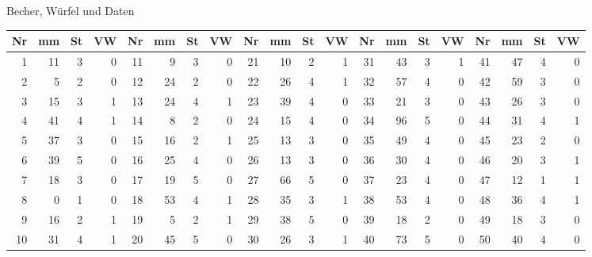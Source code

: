 \begin{uebungsblatt}{Becher, Würfel und Daten}
\begin{center}
\footnotesize
\setlength{\tabcolsep}{3.2pt}
\begin{tabular}{@{}rrrr@{\hspace{9pt}}rrrr@{\hspace{9pt}}rrrr@{\hspace{9pt}}rrrr@{\hspace{9pt}}rrrr@{}}
\toprule
\textbf{Nr} & \textbf{mm} & \textbf{St} & \textbf{VW} &
\textbf{Nr} & \textbf{mm} & \textbf{St} & \textbf{VW} &
\textbf{Nr} & \textbf{mm} & \textbf{St} & \textbf{VW} &
\textbf{Nr} & \textbf{mm} & \textbf{St} & \textbf{VW} &
\textbf{Nr} & \textbf{mm} & \textbf{St} & \textbf{VW} \\
\midrule
 1 & 11 & 3 & 0 & 11 &  9 & 3 & 0 & 21 & 10 & 2 & 1 & 31 & 43 & 3 & 1 & 41 & 47 & 4 & 0 \\
 2 &  5 & 2 & 0 & 12 & 24 & 2 & 0 & 22 & 26 & 4 & 1 & 32 & 57 & 4 & 0 & 42 & 59 & 3 & 0 \\
 3 & 15 & 3 & 1 & 13 & 24 & 4 & 1 & 23 & 39 & 4 & 0 & 33 & 21 & 3 & 0 & 43 & 26 & 3 & 0 \\
 4 & 41 & 4 & 1 & 14 &  8 & 2 & 0 & 24 & 15 & 4 & 0 & 34 & 96 & 5 & 0 & 44 & 31 & 4 & 1 \\
 5 & 37 & 3 & 0 & 15 & 16 & 2 & 1 & 25 & 13 & 3 & 0 & 35 & 49 & 4 & 0 & 45 & 23 & 2 & 0 \\
 6 & 39 & 5 & 0 & 16 & 25 & 4 & 0 & 26 & 13 & 3 & 0 & 36 & 30 & 4 & 0 & 46 & 20 & 3 & 1 \\
 7 & 18 & 3 & 0 & 17 & 19 & 5 & 0 & 27 & 66 & 5 & 0 & 37 & 23 & 4 & 0 & 47 & 12 & 1 & 1 \\
 8 &  0 & 1 & 0 & 18 & 53 & 4 & 1 & 28 & 35 & 3 & 1 & 38 & 53 & 4 & 0 & 48 & 36 & 4 & 1 \\
 9 & 16 & 2 & 1 & 19 &  5 & 2 & 1 & 29 & 38 & 5 & 0 & 39 & 18 & 2 & 0 & 49 & 18 & 3 & 0 \\
10 & 31 & 4 & 1 & 20 & 45 & 5 & 0 & 30 & 26 & 3 & 1 & 40 & 73 & 5 & 0 & 50 & 40 & 4 & 0 \\
\bottomrule
\end{tabular}
\end{center}


\end{uebungsblatt}
